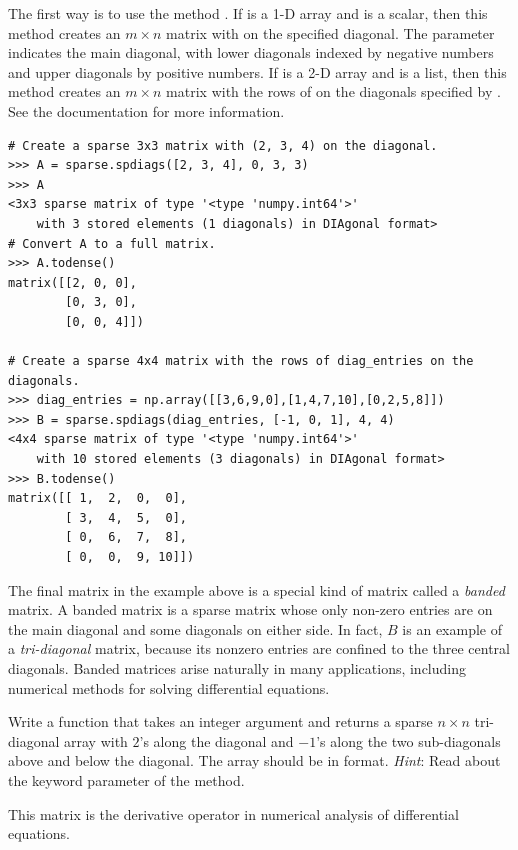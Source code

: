 The first way is to use the method . 
If  is a 1-D array and  is a scalar, then this method creates an $m \times n$ matrix with  on the specified diagonal. 
The parameter  indicates the main diagonal, with lower diagonals indexed by negative numbers and upper diagonals by positive numbers. 
If  is a 2-D array and  is a list, then this method creates an $m \times n$ matrix with the rows of  on the diagonals specified by . 
See the documentation for more information.
\begin{lstlisting}
# Create a sparse 3x3 matrix with (2, 3, 4) on the diagonal.
>>> A = sparse.spdiags([2, 3, 4], 0, 3, 3)
>>> A
<3x3 sparse matrix of type '<type 'numpy.int64'>'
	with 3 stored elements (1 diagonals) in DIAgonal format>
# Convert A to a full matrix.
>>> A.todense()
matrix([[2, 0, 0],
        [0, 3, 0],
        [0, 0, 4]])
	
# Create a sparse 4x4 matrix with the rows of diag_entries on the diagonals.
>>> diag_entries = np.array([[3,6,9,0],[1,4,7,10],[0,2,5,8]])
>>> B = sparse.spdiags(diag_entries, [-1, 0, 1], 4, 4)
<4x4 sparse matrix of type '<type 'numpy.int64'>'
	with 10 stored elements (3 diagonals) in DIAgonal format>
>>> B.todense()
matrix([[ 1,  2,  0,  0],
        [ 3,  4,  5,  0],
        [ 0,  6,  7,  8],
        [ 0,  0,  9, 10]])
\end{lstlisting}

The final matrix  in the example above is a special kind of matrix called a \emph{banded} matrix. 
A banded matrix is a sparse matrix whose only non-zero entries are on the main diagonal and some diagonals on either side. 
In fact, $B$ is an example of a \emph{tri-diagonal} matrix, because its nonzero entries are confined to the three central diagonals. 
Banded matrices arise naturally in many applications, including numerical methods for solving differential equations. 

\begin{problem}
Write a function that takes an integer argument  and returns a sparse $n\times n$
tri-diagonal array with $2$'s along the diagonal and $-1$'s along
the two sub-diagonals above and below the diagonal. 
The array should be in  format.
\emph{Hint}: Read about the  keyword parameter of the  method.

This matrix is the derivative operator in numerical analysis of differential equations.
\label{prob:sparse_tridiag}
\end{problem}

